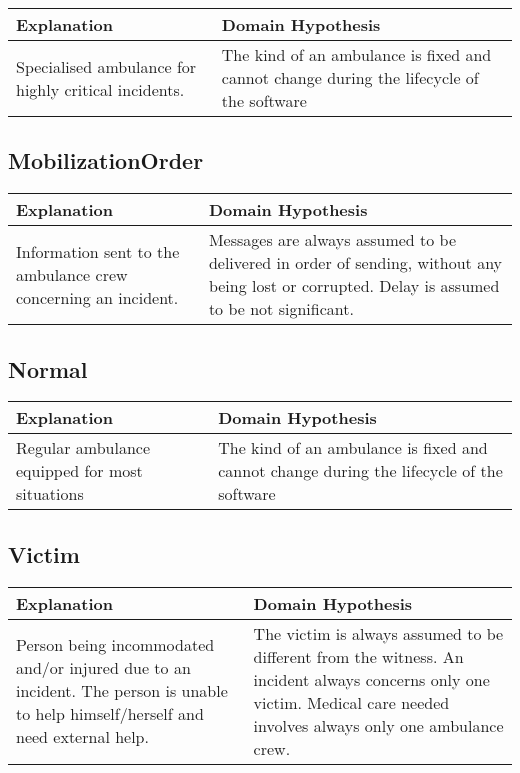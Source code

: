 \begin{tabularx}{\textwidth}{|X|X|} \hline
Explanation & Domain Hypothesis\\ \hline
Specialised ambulance for highly critical incidents.
& The kind of an ambulance is fixed and cannot change during the lifecycle of the software \\ \hline
\end{tabularx}


\subsection{MobilizationOrder}

\begin{tabularx}{\textwidth}{|X|X|} \hline
Explanation & Domain Hypothesis\\ \hline
Information sent to the ambulance crew concerning an incident. 
& Messages are always assumed to be delivered in order of sending, without any being lost or corrupted. Delay is assumed to be not significant. \\ \hline

\end{tabularx}

\subsection{Normal}

\begin{tabularx}{\textwidth}{|X|X|} \hline
Explanation & Domain Hypothesis\\ \hline
Regular ambulance equipped for most situations
& The kind of an ambulance is fixed and cannot change during the lifecycle of the software \\ \hline
\end{tabularx}


\subsection{\og Victim \fg}

\begin{tabularx}{\textwidth}{|X|X|} \hline
Explanation & Domain Hypothesis\\ \hline
Person being incommodated and/or injured due to an incident.  The person is unable to help himself/herself and need external help.
& The victim is always assumed to be different from the witness.  An incident always concerns only one victim.  Medical care needed involves always only one ambulance crew. \\ \hline
\end{tabularx}


